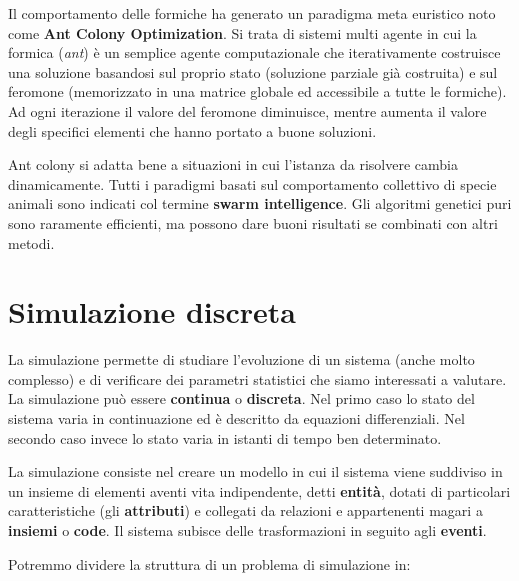 \documentclass[11pt, oneside]{book}
\begin{document}
Il comportamento delle formiche ha generato un paradigma meta
euristico noto come {\bf Ant Colony Optimization}. Si trata di sistemi
multi agente in cui la formica ({\em ant}) \`e un semplice agente
computazionale che iterativamente costruisce una soluzione basandosi
sul proprio stato (soluzione parziale gi\`a costruita) e sul feromone
(memorizzato in una matrice globale ed accessibile a tutte le
formiche). Ad ogni iterazione il valore del feromone diminuisce,
mentre aumenta il valore degli specifici elementi che hanno portato a
buone soluzioni.

\par\bigskip

Ant colony si adatta bene a situazioni in cui l'istanza da risolvere
cambia dinamicamente. Tutti i paradigmi basati sul comportamento
collettivo di specie animali sono indicati col termine {\bf swarm
  intelligence}. Gli algoritmi genetici puri sono raramente
efficienti, ma possono dare buoni risultati se combinati con altri
metodi.


\chapter{Simulazione discreta}

La simulazione permette di studiare l'evoluzione di un sistema (anche
molto complesso) e di verificare dei parametri statistici che siamo
interessati a valutare. La simulazione pu\`o essere {\bf continua} o
{\bf discreta}. Nel primo caso lo stato del sistema varia in
continuazione ed \`e descritto da equazioni differenziali. Nel secondo
caso invece lo stato varia in istanti di tempo ben determinato.

\par\bigskip

La simulazione consiste nel creare un modello in cui il sistema viene
suddiviso in un insieme di elementi aventi vita indipendente, detti
{\bf entit\`a}, dotati di particolari caratteristiche (gli {\bf
  attributi}) e collegati da relazioni e appartenenti magari a {\bf
  insiemi} o {\bf code}. Il sistema subisce delle trasformazioni in
seguito agli {\bf eventi}.

\par\bigskip

Potremmo dividere la struttura di un problema di simulazione in:
\end{document}
